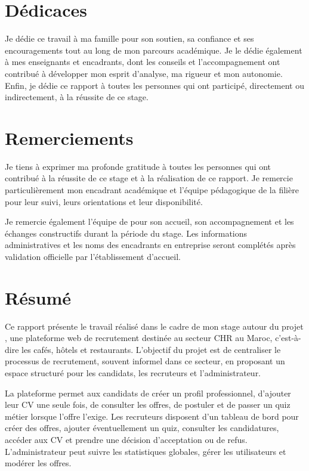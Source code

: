 \chapter*{Dédicaces}

\noindent
Je dédie ce travail à ma famille pour son soutien, sa confiance et ses encouragements tout au long de mon parcours académique. Je le dédie également à mes enseignants et encadrants, dont les conseils et l'accompagnement ont contribué à développer mon esprit d'analyse, ma rigueur et mon autonomie. Enfin, je dédie ce rapport à toutes les personnes qui ont participé, directement ou indirectement, à la réussite de ce stage.

\newpage

\chapter*{Remerciements}

\noindent
Je tiens à exprimer ma profonde gratitude à toutes les personnes qui ont contribué à la réussite de ce stage et à la réalisation de ce rapport. Je remercie particulièrement mon encadrant académique et l'équipe pédagogique de la filière \filiere{} pour leur suivi, leurs orientations et leur disponibilité.

\noindent
Je remercie également l'équipe de \entreprise{} pour son accueil, son accompagnement et les échanges constructifs durant la période du stage. Les informations administratives et les noms des encadrants en entreprise seront complétés après validation officielle par l'établissement d'accueil.

\newpage

\chapter*{Résumé}

\noindent
Ce rapport présente le travail réalisé dans le cadre de mon stage autour du projet \projectName{}, une plateforme web de recrutement destinée au secteur CHR au Maroc, c'est-à-dire les cafés, hôtels et restaurants. L'objectif du projet est de centraliser le processus de recrutement, souvent informel dans ce secteur, en proposant un espace structuré pour les candidats, les recruteurs et l'administrateur.

\noindent
La plateforme permet aux candidats de créer un profil professionnel, d'ajouter leur CV une seule fois, de consulter les offres, de postuler et de passer un quiz métier lorsque l'offre l'exige. Les recruteurs disposent d'un tableau de bord pour créer des offres, ajouter éventuellement un quiz, consulter les candidatures, accéder aux CV et prendre une décision d'acceptation ou de refus. L'administrateur peut suivre les statistiques globales, gérer les utilisateurs et modérer les offres.

